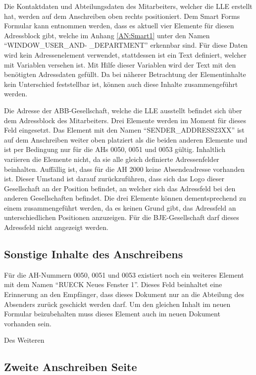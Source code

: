 	Die Kontaktdaten und Abteilungsdaten des Mitarbeiters, welcher die \ac{LLE} erstellt hat, werden auf dem Anschreiben oben rechts positioniert.
	Dem Smart Forms Formular kann entnommen werden, dass es aktuell vier Elemente für diesen Adressblock gibt, welche im Anhang \ref{AN:Smart1} unter den Namen "`WINDOW\_USER\_AND-
	\_DEPARTMENT"' erkennbar sind. Für diese Daten wird kein Adressenelement verwendet, stattdessen ist ein Text definiert, welcher mit Variablen versehen ist. Mit Hilfe dieser Variablen wird der Text mit den benötigten Adressdaten gefüllt. Da bei näherer Betrachtung der Elementinhalte kein Unterschied feststellbar ist, können auch diese Inhalte zusammengeführt werden.
	
	Die Adresse der ABB-Gesellschaft, welche die \ac{LLE} ausstellt befindet sich über dem Adressblock des Mitarbeiters. Drei Elemente werden im Moment für dieses Feld eingesetzt. Das Element mit den Namen "`SENDER\_ADDRESS23XX"' ist auf dem Anschreiben weiter oben platziert als die beiden anderen Elemente und ist per Bedingung nur für die \ac{AH}s 0050, 0051 und 0053 gültig. Inhaltlich variieren die Elemente nicht, da sie alle gleich definierte Adressenfelder beinhalten. Auffällig ist, dass für die \ac{AH} 2000 keine Absendeadresse vorhanden ist. Dieser Umstand ist darauf zurückzuführen, dass sich das Logo dieser Gesellschaft an der Position befindet, an welcher sich das Adressfeld bei den anderen Gesellschaften befindet. Die drei Elemente können dementsprechend zu einem zusammengeführt werden, da es keinen Grund gibt, das Adressfeld an unterschiedlichen Positionen anzuzeigen. Für die \ac{BJE}-Gesellschaft darf dieses Adressfeld nicht angezeigt werden.
	
	\subsection{Sonstige Inhalte des Anschreibens}
	\label{ist:rueck}
	
	Für die \ac{AH}-Nummern 0050, 0051 und 0053 existiert noch ein weiteres Element mit dem Namen "`RUECK Neues Fenster 1"'. Dieses Feld beinhaltet eine Erinnerung an den Empfänger, dass dieses Dokument nur an die Abteilung des Absenders zurück geschickt werden darf. Um den gleichen Inhalt im neuen Formular beizubehalten muss dieses Element auch im neuen Dokument vorhanden sein.
	
	Des Weiteren 
	
	\subsection{Zweite Anschreiben Seite}
	
